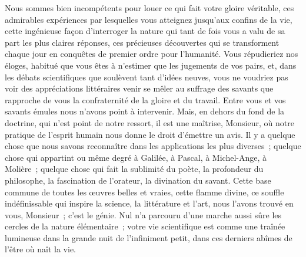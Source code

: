 \documentclass[french,twoside]{book} %
\newcommand\persName[1]{#1}
\newcommand{\salute}[1]{\bigbreak{#1}\par\medbreak}
\begin{document}
\salute{Monsieur,}
\noindent Nous sommes bien incompétents pour louer ce qui fait votre gloire véritable, ces admirables expériences par lesquelles vous atteignez jusqu’aux confins de la vie, cette ingénieuse façon d’interroger la nature qui tant de fois vous a valu de sa part les plus claires réponses, ces précieuses découvertes qui se transforment chaque jour en conquêtes de premier ordre pour l’humanité. Vous répudieriez nos éloges, habitué que vous êtes à n’estimer que les jugements de vos pairs, et, dans les débats scientifiques que soulèvent tant d’idées neuves, vous ne voudriez pas voir des appréciations littéraires venir se mêler au suffrage des savants que rapproche de vous la confraternité de la gloire et du travail. Entre vous et vos savants émules nous n’avons point à intervenir. Mais, en dehors du fond de la doctrine, qui n’est point de notre ressort, il est une maîtrise, Monsieur, où notre pratique de l’esprit humain nous donne le droit d’émettre un avis. Il y a quelque chose que nous savons reconnaître dans les applications les plus diverses ; quelque chose qui appartint ou même degré à {\persName Galilée}, à {\persName Pascal}, à {\persName Michel-Ange}, à {\persName Molière} ; quelque chose qui fait la sublimité du poète, la profondeur du philosophe, la fascination de l’orateur, la divination du savant. Cette base commune de toutes les œuvres belles et vraies, cette flamme divine, ce souffle indéfinissable qui inspire la science, la littérature et l’art, nous l’avons trouvé en vous, Monsieur ; c’est le génie. Nul n’a parcouru d’une marche aussi sûre les cercles de la nature élémentaire ; votre vie scientifique est comme une traînée lumineuse dans la grande nuit de l’infiniment petit, dans ces derniers abîmes de l’être où naît la vie.\par
\end{document}
